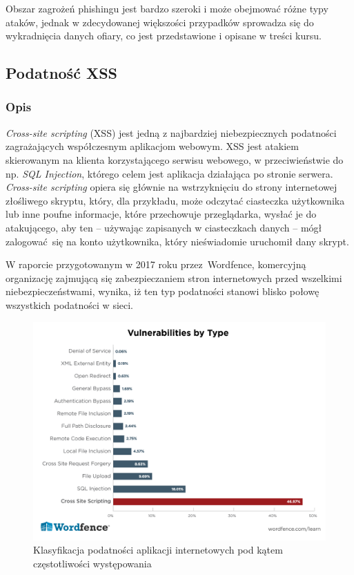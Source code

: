 \documentclass[12pt,twoside]{article}
\begin{document}
Obszar zagrożeń phishingu jest bardzo szeroki i może obejmować różne typy ataków, jednak w zdecydowanej większości przypadków sprowadza się do wykradnięcia danych ofiary, co jest przedstawione i opisane w treści kursu.

\clearpage

\subsection{Podatność XSS}
\subsubsection{Opis}

\emph{Cross-site scripting} (XSS) jest jedną z najbardziej niebezpiecznych podatności zagrażających współczesnym aplikacjom webowym. XSS jest atakiem skierowanym na klienta korzystającego serwisu webowego, w przeciwieństwie do np. \emph{SQL Injection}, którego celem jest aplikacja działająca po stronie serwera. \emph{Cross-site scripting} opiera się głównie na wstrzyknięciu do strony internetowej złośliwego skryptu, który, dla przykładu, może odczytać ciasteczka użytkownika lub inne poufne informacje, które przechowuje przeglądarka, wysłać je do atakującego, aby ten -- używając zapisanych w ciasteczkach danych -- mógł zalogować się na konto użytkownika, który nieświadomie uruchomił dany skrypt. %

W raporcie przygotowanym w 2017 roku przez Wordfence, komercyjną organizację zajmującą się zabezpieczaniem stron internetowych przed wszelkimi niebezpieczeństwami, wynika, iż ten typ podatności stanowi blisko połowę wszystkich podatności w sieci.

\begin{figure}[H]
	\centering
	\includegraphics[width=0.9\linewidth]{figures/xss-popularity}
	\caption{Klasyfikacja podatności aplikacji internetowych pod kątem częstotliwości występowania \cite{XSSReport}}
	\label{fig:xss-popularity}
\end{figure}
\end{document}
